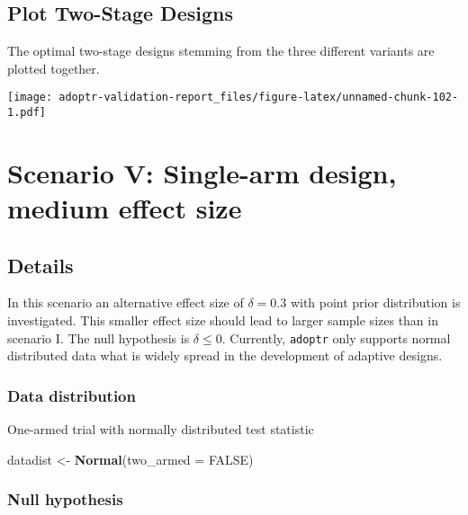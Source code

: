 \documentclass[]{book}
\newenvironment{Shaded}{\begin{snugshade}}{\end{snugshade}}
\newcommand{\DataTypeTok}[1]{\textcolor[rgb]{0.13,0.29,0.53}{#1}}
\newcommand{\KeywordTok}[1]{\textcolor[rgb]{0.13,0.29,0.53}{\textbf{#1}}}
\newcommand{\NormalTok}[1]{#1}
\newcommand{\OtherTok}[1]{\textcolor[rgb]{0.56,0.35,0.01}{#1}}
\newcommand{\StringTok}[1]{\textcolor[rgb]{0.31,0.60,0.02}{#1}}
\begin{document}
\hypertarget{plot-two-stage-designs-2}{%
\section{Plot Two-Stage Designs}\label{plot-two-stage-designs-2}}

The optimal two-stage designs stemming from the three different variants
are plotted together.

\texttt{[image: adoptr-validation-report\_files/figure-latex/unnamed-chunk-102-1.pdf]}

\hypertarget{scenarioV}{%
\chapter{Scenario V: Single-arm design, medium effect size}\label{scenarioV}}

\hypertarget{details-4}{%
\section{Details}\label{details-4}}

In this scenario an alternative effect size of \(\delta = 0.3\) with
point prior distribution is investigated.
This smaller effect size should lead to larger sample sizes than
in scenario I.
The null hypothesis is \(\delta \leq 0\).
Currently, \texttt{adoptr} only supports normal distributed data what is widely spread
in the development of adaptive designs.

\hypertarget{data-distribution-4}{%
\subsection{Data distribution}\label{data-distribution-4}}

One-armed trial with normally distributed test statistic

\begin{Shaded}
\begin{Highlighting}[]
\NormalTok{datadist <-}\StringTok{ }\KeywordTok{Normal}\NormalTok{(}\DataTypeTok{two_armed =} \OtherTok{FALSE}\NormalTok{)}
\end{Highlighting}
\end{Shaded}

\hypertarget{null-hypothesis-4}{%
\subsection{Null hypothesis}\label{null-hypothesis-4}}
\end{document}
